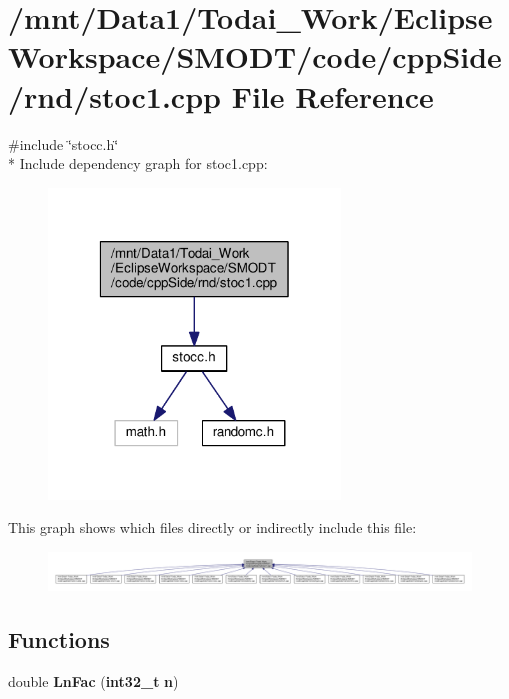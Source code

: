 \section{/mnt/\-Data1/\-Todai\-\_\-\-Work/\-Eclipse\-Workspace/\-S\-M\-O\-D\-T/code/cpp\-Side/rnd/stoc1.cpp File Reference}
\label{rnd_2stoc1_8cpp}
{\ttfamily \#include \char`\"{}stocc.\-h\char`\"{}}\\*
Include dependency graph for stoc1.\-cpp\-:
\nopagebreak
\begin{figure}[H]
\begin{center}
\leavevmode
\includegraphics[width=220pt]{rnd_2stoc1_8cpp__incl}
\end{center}
\end{figure}
This graph shows which files directly or indirectly include this file\-:
\nopagebreak
\begin{figure}[H]
\begin{center}
\leavevmode
\includegraphics[width=350pt]{rnd_2stoc1_8cpp__dep__incl}
\end{center}
\end{figure}
\subsection*{Functions}
\begin{DoxyCompactItemize}
\item 
double {\bf Ln\-Fac} ({\bf int32\-\_\-t} {\bf n})
\end{DoxyCompactItemize}
